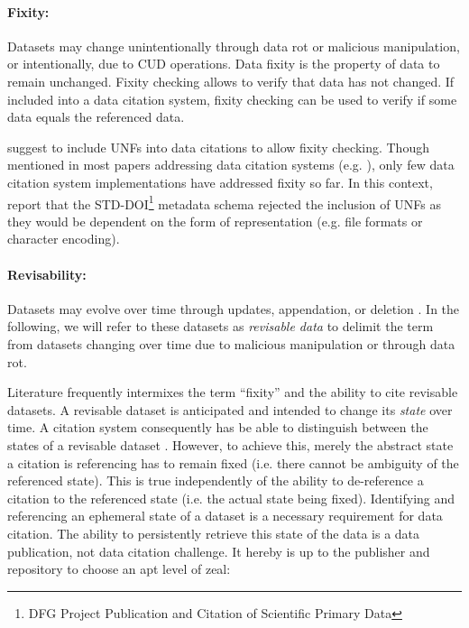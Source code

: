 \documentclass[letterpaper, twocolumn, parskip=half, fontsize=8pt, DIV=calc]{scrartcl}
\begin{document}
\paragraph{Fixity:}
Datasets may change unintentionally through data rot or malicious manipulation, or intentionally, due to \gls{CUD} operations. Data fixity is the property of data to remain unchanged. Fixity checking allows to verify that data has not changed. If included into a data citation system, fixity checking can be used to verify if some data equals the referenced data.

\citep{AltKin07, Rauber2015, Crosas2011} suggest to include \glspl{UNF} into data citations to allow fixity checking. Though mentioned in most papers addressing data citation systems (e.g. \citep{Buneman2016, Davidson2017}), only few data citation system implementations have addressed fixity so far. In this context, \cite{Klump2016} report that the STD-DOI\footnote{\gls{DFG} Project Publication and Citation of Scientific Primary Data} metadata schema rejected the inclusion of \glspl{UNF} as they would be dependent on the form of representation (e.g. file formats or character encoding).


\paragraph{Revisability:}
Datasets may evolve over time through updates, appendation, or deletion \citep{Klump2016}. In the following, we will refer to these datasets as \textit{revisable data} to delimit the term from datasets changing over time due to malicious manipulation or through data rot.

Literature frequently intermixes the term ``fixity'' and the ability to cite revisable datasets. A revisable dataset is anticipated and intended to change its \textit{state} over time. A citation system consequently has be able to distinguish between the states of a revisable dataset \citep{Rauber2015, Klump2016}. However, to achieve this, merely the abstract state a citation is referencing has to remain fixed (i.e. there cannot be ambiguity of the referenced state).
This is true independently of the ability to de-reference a citation to the referenced state (i.e. the actual state being fixed). Identifying and referencing an ephemeral state of a dataset is a necessary requirement for data citation. The ability to persistently retrieve this state of the data is a data publication, not data citation challenge. It hereby is up to the publisher and repository to choose an apt level of zeal:
\end{document}
